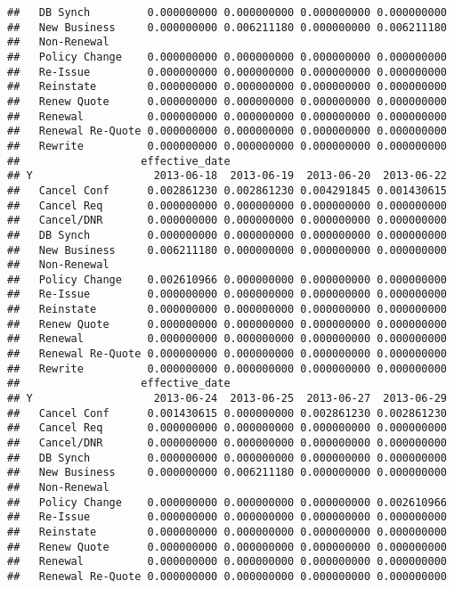 \documentclass[]{article}
\begin{document}
\begin{verbatim}
##   DB Synch         0.000000000 0.000000000 0.000000000 0.000000000
##   New Business     0.000000000 0.006211180 0.000000000 0.006211180
##   Non-Renewal                                                     
##   Policy Change    0.000000000 0.000000000 0.000000000 0.000000000
##   Re-Issue         0.000000000 0.000000000 0.000000000 0.000000000
##   Reinstate        0.000000000 0.000000000 0.000000000 0.000000000
##   Renew Quote      0.000000000 0.000000000 0.000000000 0.000000000
##   Renewal          0.000000000 0.000000000 0.000000000 0.000000000
##   Renewal Re-Quote 0.000000000 0.000000000 0.000000000 0.000000000
##   Rewrite          0.000000000 0.000000000 0.000000000 0.000000000
##                   effective_date
## Y                   2013-06-18  2013-06-19  2013-06-20  2013-06-22
##   Cancel Conf      0.002861230 0.002861230 0.004291845 0.001430615
##   Cancel Req       0.000000000 0.000000000 0.000000000 0.000000000
##   Cancel/DNR       0.000000000 0.000000000 0.000000000 0.000000000
##   DB Synch         0.000000000 0.000000000 0.000000000 0.000000000
##   New Business     0.006211180 0.000000000 0.000000000 0.000000000
##   Non-Renewal                                                     
##   Policy Change    0.002610966 0.000000000 0.000000000 0.000000000
##   Re-Issue         0.000000000 0.000000000 0.000000000 0.000000000
##   Reinstate        0.000000000 0.000000000 0.000000000 0.000000000
##   Renew Quote      0.000000000 0.000000000 0.000000000 0.000000000
##   Renewal          0.000000000 0.000000000 0.000000000 0.000000000
##   Renewal Re-Quote 0.000000000 0.000000000 0.000000000 0.000000000
##   Rewrite          0.000000000 0.000000000 0.000000000 0.000000000
##                   effective_date
## Y                   2013-06-24  2013-06-25  2013-06-27  2013-06-29
##   Cancel Conf      0.001430615 0.000000000 0.002861230 0.002861230
##   Cancel Req       0.000000000 0.000000000 0.000000000 0.000000000
##   Cancel/DNR       0.000000000 0.000000000 0.000000000 0.000000000
##   DB Synch         0.000000000 0.000000000 0.000000000 0.000000000
##   New Business     0.000000000 0.006211180 0.000000000 0.000000000
##   Non-Renewal                                                     
##   Policy Change    0.000000000 0.000000000 0.000000000 0.002610966
##   Re-Issue         0.000000000 0.000000000 0.000000000 0.000000000
##   Reinstate        0.000000000 0.000000000 0.000000000 0.000000000
##   Renew Quote      0.000000000 0.000000000 0.000000000 0.000000000
##   Renewal          0.000000000 0.000000000 0.000000000 0.000000000
##   Renewal Re-Quote 0.000000000 0.000000000 0.000000000 0.000000000

\end{verbatim}
\end{document}
